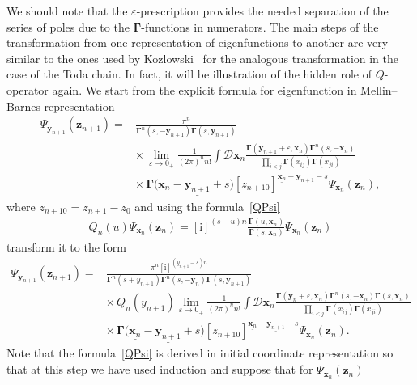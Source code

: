 \documentclass[10pt,a4paper]{amsart}
\renewcommand{\imath}{\mathrm{i}}
\numberwithin{equation}{section}
\begin{document}
We should note that the $\varepsilon$-prescription provides
the needed separation of the series of poles due to
the $\mathbf{\Gamma}$-functions in numerators.
The main steps of the transformation from one representation of
eigenfunctions to another are very similar to the ones used
by Kozlowski~\cite{KK} for the analogous transformation in the
case of the Toda chain. In fact, it will be illustration of the hidden
role of $Q$-operator again.
We start from the explicit formula for eigenfunction in Mellin--Barnes representation
\begin{align*}
\Psi_{\bm{y}_{n+1}}(\bm{z}_{n+1}) ={}&
\frac{\pi^n}{\mathbf{\Gamma}^{n}(s ,-\bm{y}_{n+1})
\mathbf{\Gamma}(s ,\bm{y}_{n+1})} \\
& {\times}\,
\lim\limits_{\varepsilon\to 0_+}
\frac{1}{(2\pi)^n n!} \int \mathcal{D}\bm{x}_{n}
\frac{\mathbf{\Gamma}(\bm y_{n+1}+\varepsilon,\bm x_{n})
\mathbf{\Gamma}^{n}(s ,-\bm{x}_{n})}
{\prod\limits_{i<j}\mathbf{\Gamma}(x_{ij})\mathbf{\Gamma}(x_{ji})} \\
& {\times}\,
\mathbf{\Gamma}\bigl(\underline{\bm{x}_{n}}-\underline{\bm{y}_{n+1}}+s\bigr)
[z_{n+1 0}]^{\underline{\bm{x}_{n}}-\underline{\bm{y}_{n+1}}-s}
\Psi_{\bm{x}_{n}}(\bm{z}_{n}) ,
\end{align*}
where $z_{n+1 0}= z_{n+1}-z_0$ and using the formula~\eqref{QPsi}
\begin{align*}
Q_n(u) \Psi_{\bm x_n}(\bm z_n)
= [\imath]^{(s-u)n} \frac{\mathbf{\Gamma}(u ,\bm{x}_n)}
{\mathbf{\Gamma}(s ,\bm{x}_n)} \Psi_{\bm x_n}(\bm z_n)
\end{align*}
transform it to the form
\begin{align*}
\Psi_{\bm{y}_{n+1}}(\bm{z}_{n+1}) ={}&
\frac{\pi^n [\imath]^{(y_{n+1}-s)n}}
{\mathbf{\Gamma}^{n}(s+y_{n+1})
\mathbf{\Gamma}^{n}(s ,-\bm{y}_{n})
\mathbf{\Gamma}(s ,\bm{y}_{n+1})} \\
& {\times}\, Q_n(y_{n+1})
\lim\limits_{\varepsilon\to 0_+}
\frac{1}{(2\pi)^n n!} \int \mathcal{D}\bm{x}_{n}
\frac{\mathbf{\Gamma}(\bm y_{n}+\varepsilon,\bm x_{n})
\mathbf{\Gamma}^{n}(s ,-\bm{x}_{n})\mathbf{\Gamma}(s ,\bm{x}_n)}
{\prod\limits_{i<j}\mathbf{\Gamma}(x_{ij})\mathbf{\Gamma}(x_{ji})} \\
& {\times}\,
\mathbf{\Gamma}\bigl(\underline{\bm{x}_{n}}-\underline{\bm{y}_{n+1}}+s\bigr)
[z_{n+1 0}]^{\underline{\bm{x}_{n}}-\underline{\bm{y}_{n+1}}-s}
\Psi_{\bm{x}_{n}}(\bm{z}_{n}) .
\end{align*}
Note that the formula~\eqref{QPsi} is derived in initial
coordinate representation so that at this step we have
used induction and suppose that for $\Psi_{\bm{x}_{n}}(\bm{z}_{n})$
\end{document}
